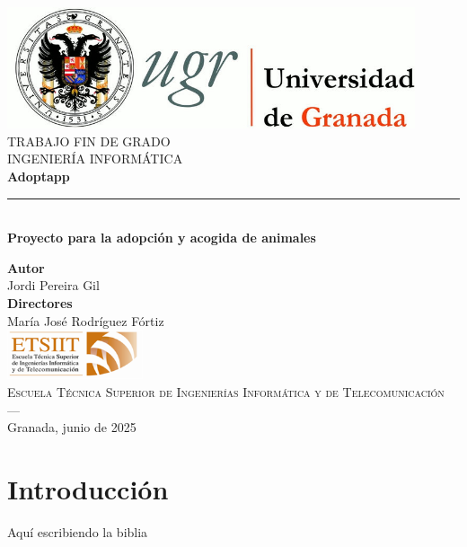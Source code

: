 \documentclass{article}
\renewcommand\maketitle{} %
\begin{document}
	\begin{titlepage}
		
		
		\newlength{\centeroffset}
		\setlength{\centeroffset}{-0.5\oddsidemargin}
		\addtolength{\centeroffset}{0.5\evensidemargin}
		\thispagestyle{empty}
		
		\noindent\hspace*{\centeroffset}\begin{minipage}{\textwidth}
			
			\centering
			\includegraphics[width=0.9\textwidth]{imagenes/logo_ugr.jpg}\\[1.4cm]
			
			\textsc{ \Large TRABAJO FIN DE GRADO\\[0.2cm]}
			\textsc{ INGENIERÍA INFORMÁTICA}\\[1cm]
			{\Huge\bfseries Adoptapp\\
			}
			\noindent\rule[-1ex]{\textwidth}{3pt}\\[3.5ex]
			{\large\bfseries Proyecto para la adopción y acogida de animales}
		\end{minipage}
		
		\vspace{2.5cm}
		\noindent\hspace*{\centeroffset}\begin{minipage}{\textwidth}
			\centering
			
			\textbf{Autor}\\ {Jordi Pereira Gil}\\[2.5ex]
			\textbf{Directores}\\
			{María José Rodríguez Fórtiz}\\[2cm]
			\includegraphics[width=0.3\textwidth]{imagenes/etsiit_logo.png}\\[0.1cm]
			\textsc{Escuela Técnica Superior de Ingenierías Informática y de Telecomunicación}\\
			\textsc{---}\\
			Granada, junio de 2025
		\end{minipage}
	\end{titlepage}
	
	
	

\maketitle

\section{Introducción}
Aquí escribiendo la biblia






\end{document}
